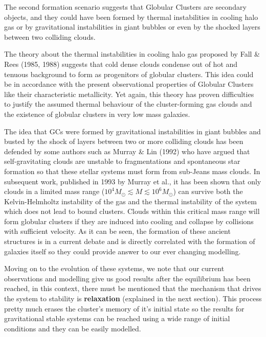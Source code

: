 The second formation scenario suggests that Globular Clusters are secondary objects, and they could have been formed by thermal instabilities in cooling halo gas or by gravitational instabilities in giant bubbles or even by the shocked layers between two colliding clouds. 

The theory about the thermal instabilities in cooling halo gas proposed by Fall \& Rees (1985, 1988)  suggests that cold dense clouds condense out of hot and tenuous background to form as progenitors of globular clusters. This idea could be in accordance with the present observational properties of Globular Clusters like their characteristic metallicity. Yet again, this theory has proven difficulties to justify the assumed thermal behaviour of the cluster-forming gas clouds and the existence of globular clusters in very low mass galaxies.

The idea that GCs were formed by gravitational instabilities in giant bubbles and busted by the shock of layers between two or more colliding clouds has been defended by some authors such as Murray \& Lin (1992) who have argued that self-gravitating clouds are unstable to fragmentations and spontaneous star formation so that these stellar systems must form from sub-Jeans mass clouds. In subsequent work, published in 1993 by Murray et al., it has been shown that only clouds in a limited mass range ($10^{4}M_\odot\lesssim M\lesssim 10^{6}M_\odot$) can survive both the Kelvin-Helmholtz instability of the gas and the thermal instability of the system which does not lead to bound clusters. Clouds within this critical mass range will form globular clusters if they are induced into cooling and collapse by collisions with sufficient velocity. As it can be seen, the formation of these ancient structures is in a current debate and is directly correlated with the formation of galaxies itself so they could provide answer to our ever changing modelling. 

Moving on to the evolution of these systems, we note that our current observations and modelling give us good results after the equilibrium has been reached, in this context, there must be mentioned that the mechanism that drives the system to stability is \textbf{relaxation} (explained in the next section). This process pretty much erases the cluster's memory of it's initial state so the results for gravitational stable systems can be reached using a wide range of initial conditions and they can be easily modelled.

